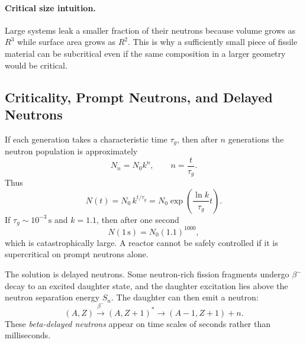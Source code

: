 \paragraph{Critical size intuition.}
Large systems leak a smaller fraction of their neutrons because volume grows as
$R^3$ while surface area grows as $R^2$. This is why a sufficiently small piece
of fissile material can be subcritical even if the same composition in a larger
geometry would be critical.

\subsection{Criticality, Prompt Neutrons, and Delayed Neutrons}
\label{subsec:lec11:criticality_delayed}

If each generation takes a characteristic time $\tau_g$, then after $n$
generations the neutron population is approximately
\begin{equation}
  N_n=N_0k^n,
  \qquad
  n=\frac{t}{\tau_g}.
\end{equation}
Thus
\begin{equation}
  \boxed{N(t)=N_0\,k^{t/\tau_g}
  =N_0\exp\left(\frac{\ln k}{\tau_g}t\right).}
  \label{eq:lec11:neutron_growth}
\end{equation}
If $\tau_g\sim10^{-3}\,\mathrm s$ and $k=1.1$, then after one second
\begin{equation}
  N(1\,\mathrm s)=N_0(1.1)^{1000},
\end{equation}
which is catastrophically large. A reactor cannot be safely controlled if it is
supercritical on prompt neutrons alone.

The solution is delayed neutrons. Some neutron-rich fission fragments undergo
$\beta^-$ decay to an excited daughter state, and the daughter excitation lies
above the neutron separation energy $S_n$. The daughter can then emit a neutron:
\begin{equation}
  (A,Z)\xrightarrow{\beta^-}(A,Z+1)^\ast
  \longrightarrow (A-1,Z+1)+n.
\end{equation}
These \emph{beta-delayed neutrons} appear on time scales of seconds rather than
milliseconds.


